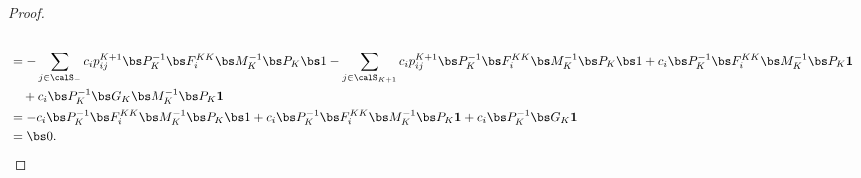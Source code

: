 \begin{proof}
\begin{align*}
		\\&= -\sum_{j\in\calS_-} c_ip_{ij}^{K+1} \bs P_K^{-1}\bs F_i^{KK}\bs M_K^{-1}\bs P_K \bs 1 -\sum_{j\in\calS_{{K+1}}}c_ip_{ij}^{K+1} \bs P_K^{-1}\bs F_i^{KK}\bs M_K^{-1}\bs P_K\bs 1+ c_i \bs P_K^{-1}\bs F_i^{KK}\bs M_K^{-1}\bs P_K\boldsymbol 1
		\\&\quad{}+ c_i \bs P_K^{-1}\bs G_K\bs M_K^{-1}\bs P_K\boldsymbol 1
		\\&= - c_i \bs P_K^{-1}\bs F_i^{KK}\bs M_K^{-1}\bs P_K \bs 1 + c_i \bs P_K^{-1}\bs F_i^{KK}\bs M_K^{-1}\bs P_K\boldsymbol 1 + c_i \bs P_K^{-1}\bs G_K\boldsymbol 1
		\\&= \bs 0.
	\end{align*}


\end{proof}
